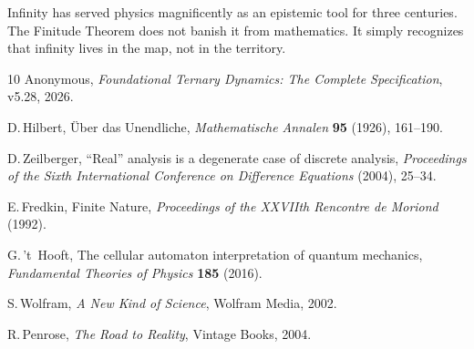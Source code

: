 \documentclass[11pt]{article}
\theoremstyle{tight}
\theoremstyle{plainroman}
\begin{document}
Infinity has served physics magnificently as an epistemic tool for three centuries.
The Finitude Theorem does not banish it from mathematics.
It simply recognizes that infinity lives in the map, not in the territory.

\begin{thebibliography}{10}
Anonymous,
\emph{Foundational Ternary Dynamics: The Complete Specification}, v5.28, 2026.

D.\,Hilbert,
\"Uber das Unendliche,
\emph{Mathematische Annalen} \textbf{95} (1926), 161--190.

D.\,Zeilberger,
``Real'' analysis is a degenerate case of discrete analysis,
\emph{Proceedings of the Sixth International Conference on Difference Equations} (2004), 25--34.

E.\,Fredkin,
Finite Nature,
\emph{Proceedings of the XXVIIth Rencontre de Moriond} (1992).

G.\,'t~Hooft,
The cellular automaton interpretation of quantum mechanics,
\emph{Fundamental Theories of Physics} \textbf{185} (2016).

S.\,Wolfram,
\emph{A New Kind of Science},
Wolfram Media, 2002.

R.\,Penrose,
\emph{The Road to Reality},
Vintage Books, 2004.
\end{thebibliography}
\end{document}
